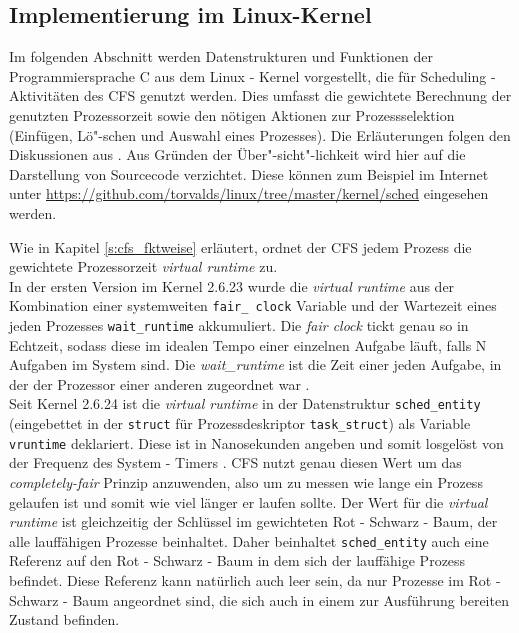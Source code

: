\subsection{Implementierung im Linux-Kernel}\label{s:cstructs}
Im folgenden Abschnitt werden Datenstrukturen und Funktionen der Programmiersprache C aus dem Linux - Kernel vorgestellt, die für Scheduling - Aktivitäten des CFS genutzt werden. Dies umfasst die gewichtete Berechnung der genutzten Prozessorzeit sowie den nötigen Aktionen zur Prozessselektion (Einfügen, Lö"-schen und Auswahl eines Prozesses). Die Erläuterungen folgen den Diskussionen aus \cite{rlove}. Aus Gründen der Über"-sicht"-lichkeit wird hier auf die Darstellung von Sourcecode verzichtet. Diese können zum Beispiel im Internet unter \url{https://github.com/torvalds/linux/tree/master/kernel/sched} eingesehen werden.

Wie in Kapitel \ref{s:cfs_fktweise} erläutert, ordnet der CFS jedem Prozess die gewichtete Prozessorzeit \textit{virtual runtime} zu. \\
In der ersten Version im Kernel 2.6.23 wurde die \textit{virtual runtime} aus der Kombination einer systemweiten \texttt{fair\_ clock} Variable und der Wartezeit eines jeden Prozesses \texttt{wait\_runtime} akkumuliert. Die \textit{fair clock} tickt genau so in Echtzeit, sodass diese im idealen Tempo einer einzelnen Aufgabe läuft, falls N Aufgaben im System sind. Die \textit{wait\_runtime} ist die Zeit einer jeden Aufgabe, in der der Prozessor einer anderen zugeordnet war \cite{cpabla}.\\
Seit Kernel 2.6.24 ist die \textit{virtual runtime} in der Datenstruktur \texttt{sched\_entity} (eingebettet in der \texttt{struct} für Prozessdeskriptor \texttt{task\_struct}) als Variable \texttt{vruntime} deklariert. Diese ist in Nanosekunden angeben und somit losgelöst von der Frequenz des System - Timers \cite{rlove}. CFS nutzt genau diesen Wert um das \textit{completely-fair} Prinzip anzuwenden, also um zu messen wie lange ein Prozess gelaufen ist und somit wie viel länger er laufen sollte.
Der Wert für die \textit{virtual runtime} ist gleichzeitig der Schlüssel im gewichteten Rot - Schwarz - Baum, der alle lauffähigen Prozesse beinhaltet. Daher beinhaltet \texttt{sched\_entity} auch eine Referenz auf den Rot - Schwarz - Baum in dem sich der lauffähige Prozess befindet. Diese Referenz kann natürlich auch leer sein, da nur Prozesse im Rot - Schwarz - Baum angeordnet sind, die sich auch in einem zur Ausführung bereiten Zustand befinden.

